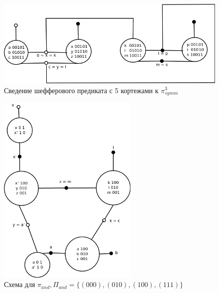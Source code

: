 \documentclass[12pt]{article}
\begin{document}
\begin{figure}[htb]
 \centering
\includegraphics[width=1.0\textwidth]{sch5.png}
\caption{Сведение шефферового предиката с 5 кортежами к $\pi_{symm}^3$ }
\label{fig:sheff5tosheff3}
\end{figure}



\begin{figure}[htb]
\centering
\includegraphics[width=0.6\textwidth]{min_and.png}
\caption{Схема для $\pi_{and}, \Pi_{and} = \{ (000), (010), (100), (111) \}$}
\label{fig:and}
\end{figure}
\end{document}

